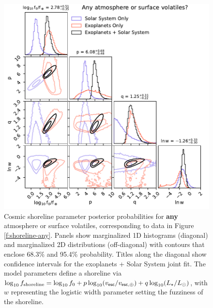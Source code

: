 \documentclass[modern,linenumbers,trackchanges]{aastex7}
\begin{document}
\begin{figure}[ht!]
\includegraphics[width=\textwidth]{figures/posteriors-any.pdf}

\caption{Cosmic shoreline parameter posterior probabilities for {\bf any} atmosphere or surface volatiles, corresponding to data in Figure \ref{f:shoreline-any}. Panels show marginalized 1D histograms (diagonal) and marginalized 2D distributions (off-diagonal) with contours that enclose 68.3\% and 95.4\% probability. Titles along the diagonal show confidence intervals for the exoplanets + Solar System joint fit. The model parameters define a shoreline via $\log_{10} f_{\rm shoreline} = \log_{10} f_{0} + p \log_{10} (v_{\sf esc}/v_{\sf esc, \oplus}) + q \log_{10} (L_\star/L_\odot)$, with $w$ representing the logistic width parameter setting the fuzziness of the shoreline.}
\label{f:posteriors-any}
\end{figure}
\end{document}
